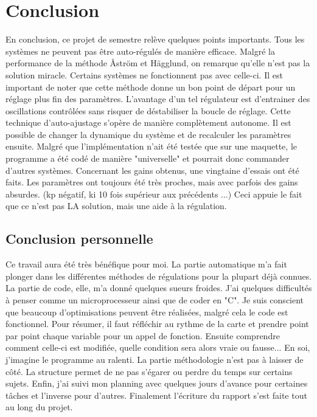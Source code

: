 \section{Conclusion}
En conclusion, ce projet de semestre relève quelques points importants. Tous les systèmes ne peuvent pas être auto-régulés de manière efficace. Malgré la performance de la méthode Åström et Hägglund, on remarque qu'elle n'est pas la solution miracle. Certains systèmes ne fonctionnent pas avec celle-ci. Il est important de noter que cette méthode donne un bon point de départ pour un réglage plus fin des paramètres. L'avantage d'un tel régulateur est d'entrainer des oscillations contrôlées sans risquer de déstabiliser la boucle de réglage. Cette technique d'auto-ajustage s'opère de manière complètement autonome. Il est possible de changer la dynamique du système et de recalculer les paramètres ensuite. Malgré que l'implémentation n'ait été testée que sur une maquette, le programme a été codé de manière "universelle" et pourrait donc commander d'autres systèmes. 
Concernant les gains obtenus, une vingtaine d'essais ont été faits. Les paramètres ont toujours été très proches, mais avec parfois des gains absurdes. (kp négatif, ki 10 fois supérieur aux précédents ...) Ceci appuie le fait que ce n'est pas LA solution, mais une aide à la régulation.


\subsection{Conclusion personnelle}
Ce travail aura été très bénéfique pour moi. La partie automatique m'a fait plonger dans les différentes méthodes de régulations pour la plupart déjà connues. La partie de code, elle, m'a donné quelques sueurs froides. J'ai quelques difficultés à penser comme un microprocesseur ainsi que de coder en "C". Je suis conscient que beaucoup d'optimisations peuvent être réalisées, malgré cela le code est fonctionnel. Pour résumer, il faut réfléchir au rythme de la carte et prendre point par point chaque variable pour un appel de fonction. Ensuite comprendre comment celle-ci est modifiée, quelle condition sera alors vraie ou fausse... En soi, j'imagine le programme au ralenti. La partie méthodologie n'est pas à laisser de côté. La structure permet de ne pas s'égarer ou perdre du temps sur certains sujets. Enfin, j'ai suivi mon planning avec quelques jours d'avance pour certaines tâches et l'inverse pour d'autres. Finalement l'écriture du rapport s'est faite tout au long du projet. 

